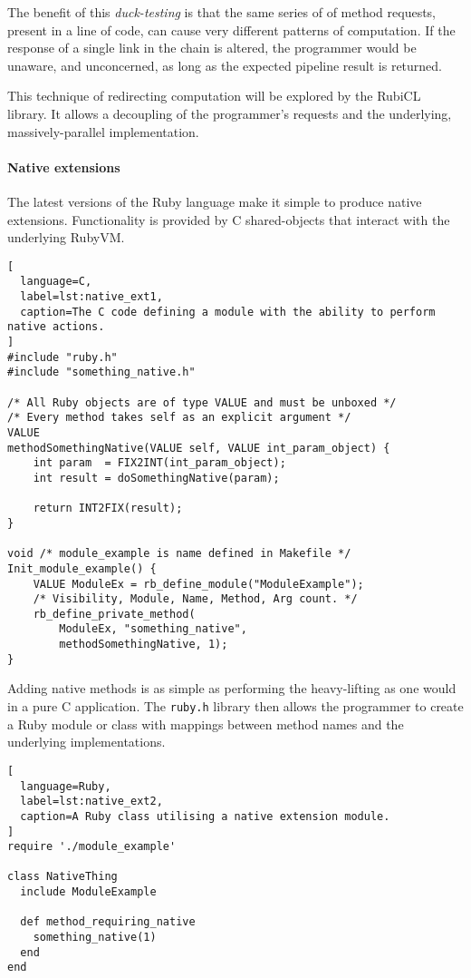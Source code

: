 The benefit of this \emph{duck-testing} is that the same series of of method requests, present in a line of code, can cause very different patterns of computation. If the response of a single link in the chain is altered, the programmer would be unaware, and unconcerned, as long as the expected pipeline result is returned.

This technique of redirecting computation will be explored by the RubiCL library. It allows a decoupling of the programmer's requests and the underlying, massively-parallel implementation.

\paragraph*{Native extensions}
The latest versions of the Ruby language make it simple to produce native extensions. Functionality is provided by C shared-objects that interact with the underlying \ac{RubyVM}.

\begin{lstlisting}[
  language=C,
  label=lst:native_ext1,
  caption=The C code defining a module with the ability to perform native actions.
]
#include "ruby.h"
#include "something_native.h"

/* All Ruby objects are of type VALUE and must be unboxed */
/* Every method takes self as an explicit argument */
VALUE
methodSomethingNative(VALUE self, VALUE int_param_object) {
    int param  = FIX2INT(int_param_object);
    int result = doSomethingNative(param);

    return INT2FIX(result);
}

void /* module_example is name defined in Makefile */
Init_module_example() {
    VALUE ModuleEx = rb_define_module("ModuleExample");
    /* Visibility, Module, Name, Method, Arg count. */
    rb_define_private_method(
        ModuleEx, "something_native",
        methodSomethingNative, 1);
}
\end{lstlisting}

Adding native methods is as simple as performing the heavy-lifting as one would in a pure C application. The \verb|ruby.h| library then allows the programmer to create a Ruby module or class with mappings between method names and the underlying implementations.

\begin{lstlisting}[
  language=Ruby,
  label=lst:native_ext2,
  caption=A Ruby class utilising a native extension module.
]
require './module_example'

class NativeThing
  include ModuleExample

  def method_requiring_native
    something_native(1)
  end
end
\end{lstlisting}

